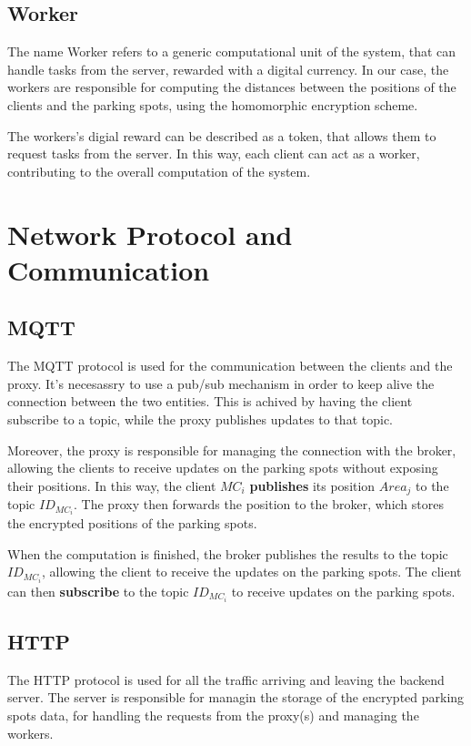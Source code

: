 \documentclass[12pt,a4paper,twoside]{book}
\begin{document}
\subsection{Worker}
The name Worker refers to a generic computational unit of the system, that can handle tasks from the server, rewarded with a digital currency. In our case, the workers are responsible for computing the distances between the positions of the clients and the parking spots, using the homomorphic encryption scheme. 

The workers's digial reward can be described as a token, that allows them to request tasks from the server. In this way, each client can act as a worker, contributing to the overall computation of the system.

\section{Network Protocol and Communication}
\subsection{MQTT}

The MQTT protocol is used for the communication between the clients and the proxy. It's necesassry to use a pub/sub mechanism in order to keep alive the connection between the two entities. This is achived by having the client subscribe to a topic, while the proxy publishes updates to that topic.

Moreover, the proxy is responsible for managing the connection with the broker, allowing the clients to receive updates on the parking spots without exposing their positions. In this way, the client $MC_i$ \textbf{publishes} its position $Area_j$ to the topic $ID_{MC_i}$. The proxy then forwards the position to the broker, which stores the encrypted positions of the parking spots.

When the computation is finished, the broker publishes the results to the topic $ID_{MC_i}$, allowing the client to receive the updates on the parking spots. The client can then \textbf{subscribe} to the topic $ID_{MC_i}$ to receive updates on the parking spots.

\subsection{HTTP}
The HTTP protocol is used for all the traffic arriving and leaving the backend server. The server is responsible for managin the storage of the encrypted parking spots data, for handling the requests from the proxy(s) and managing the workers.
\end{document}
